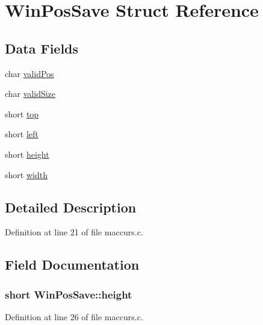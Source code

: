 \hypertarget{structWinPosSave}{\section{Win\+Pos\+Save Struct Reference}
\label{structWinPosSave}
}
\subsection*{Data Fields}
\begin{DoxyCompactItemize}
\item 
char \hyperlink{structWinPosSave_af75cf20f7e9b3652c92a71144aa5f04b}{valid\+Pos}
\item 
char \hyperlink{structWinPosSave_ad3e75df1e54e30579612f2d446cc4fa7}{valid\+Size}
\item 
short \hyperlink{structWinPosSave_ac35101a83baaa8d1d95401080e1ae44c}{top}
\item 
short \hyperlink{structWinPosSave_a02f324c04a83153db807c1732244b79e}{left}
\item 
short \hyperlink{structWinPosSave_a53e5ad34a53760f5505844f893e1181d}{height}
\item 
short \hyperlink{structWinPosSave_aa7a3f1531159d0341e13b9b46c76747c}{width}
\end{DoxyCompactItemize}


\subsection{Detailed Description}


Definition at line 21 of file maccurs.\+c.



\subsection{Field Documentation}
\hypertarget{structWinPosSave_a53e5ad34a53760f5505844f893e1181d}{
\subsubsection[{height}]{\setlength{\rightskip}{0pt plus 5cm}short Win\+Pos\+Save\+::height}}\label{structWinPosSave_a53e5ad34a53760f5505844f893e1181d}


Definition at line 26 of file maccurs.\+c.



